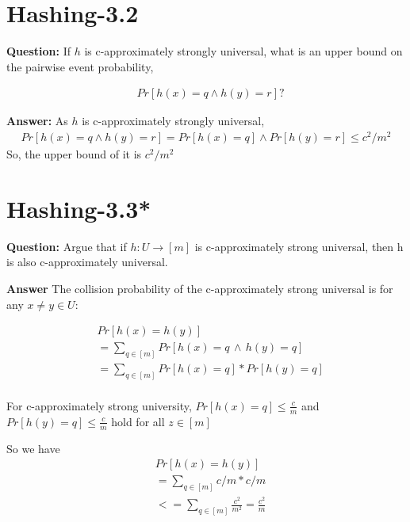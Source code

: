 \documentclass[12pt]{article}
\begin{document}
\section{Hashing-3.2}
\textbf{Question: }
If $h$ is c-approximately strongly universal, what is an upper bound on the pairwise event probability,

\begin{align}
&Pr[h(x) = q \wedge h(y) = r]?
\end{align}

\textbf{Answer:}
As $h$ is c-approximately strongly universal, 
\begin{align}
    Pr[h(x) = q \wedge h(y) = r] = Pr[h(x) = q] \wedge Pr[h(y) = r]\leq c^2/m^2
\end{align}
So, the upper bound of it is $c^2/m^2$

\section{Hashing-3.3* }
\textbf{Question: }
Argue that if $h: U \rightarrow [m]$ is c-approximately strong universal, then h is also c-approximately universal.

\textbf{Answer}
The collision probability of the c-approximately strong universal is for any $x \neq y \in U$:

\begin{equation}
\begin{aligned}
&Pr[h(x)=h(y)] \\
&= \sum_{q \in [m]} Pr[h(x) = q \, \land \, h(y) = q]\\
&=\sum_{q \in [m]} Pr[h(x) = q] * Pr[h(y) = q]\\
\end{aligned}
\end{equation}

For c-approximately strong university, $Pr[h(x) = q] \leq \frac{c}{m}$ and $Pr[h(y) = q] \leq \frac{c}{m}$ hold for all $z \in [m]$

So we have
\begin{equation}
\begin{aligned}
&Pr[h(x)=h(y)] \\
&= \sum_{q \in [m]} c/m * c/m\\
&<=\sum_{q \in [m]}   \frac{c^2}{m^2}
= \frac{c^2}{m}
\end{aligned}
\end{equation}
\end{document}
